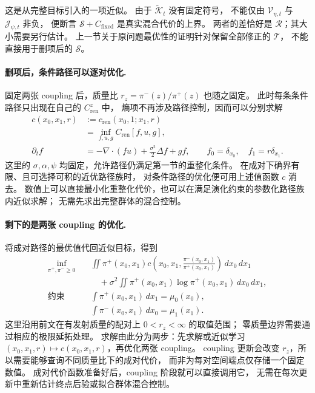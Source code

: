 \documentclass[UTF8,a4paper,11pt,fontset=fandol]{ctexart}
\begin{document}
这是从完整目标引入的一项近似。
由于 $\widetilde{\mathcal K}_t$ 没有固定符号，
不能仅由 $\mathcal V_{\eta,t}$ 与 $\mathcal J_{\psi,t}$ 非负，
便断言 $\mathcal S+C_{\mathrm{fixed}}$ 是真实混合代价的上界。
两者的差恰好是 $\mathcal R$；其大小需要另行估计。
上一节关于原问题最优性的证明针对保留全部修正的 $\mathcal T$，
不能直接用于删项后的 $\mathcal S$。

\paragraph{删项后，条件路径可以逐对优化.}
固定两张 coupling 后，质量比 $r_z=\pi^-(z)/\pi^+(z)$ 也随之固定。
此时每条条件路径只出现在自己的 $C_{\mathrm{ren}}^z$ 中，
熵项不再涉及路径控制，因而可以分别求解
\begin{equation}
\begin{aligned}
c(x_0,x_1,r)
&:=c_{\mathrm{ren}}(x_0,1;x_1,r)\\
&=\inf_{f,u,g}C_{\mathrm{ren}}[f,u,g],\\
\partial_tf
&=-\nabla\cdot(fu)+\frac{\sigma^2}{2}\Delta f+gf,
\qquad f_0=\delta_{x_0},\quad f_1=r\delta_{x_1}.
\end{aligned}
\label{eq:independent-pair-cost}
\end{equation}
这里的 $\sigma,\alpha,\psi$ 均固定，允许路径仍满足第一节的重整化条件。
在成对下确界有限、且可选择可积的近优路径族时，
对条件路径的优化便可用上述值函数 $c$ 消去。
数值上可以直接最小化重整化代价，也可以在满足演化约束的参数化路径族内近似求解；
无需先求出完整群体的混合控制。

\paragraph{剩下的是两张 coupling 的优化.}
将成对路径的最优值代回近似目标，得到
\begin{equation}
\boxed{
\begin{aligned}
\inf_{\pi^+,\pi^-\ge0}\quad
&\iint\pi^+(x_0,x_1)
c\!\left(x_0,x_1,\frac{\pi^-(x_0,x_1)}{\pi^+(x_0,x_1)}\right)\,dx_0\,dx_1\\
&\quad+\sigma^2\iint\pi^+(x_0,x_1)\log\pi^+(x_0,x_1)\,dx_0\,dx_1,\\
\text{约束}\quad
&\int\pi^+(x_0,x_1)\,dx_1=\mu_0(x_0),\\
&\int\pi^-(x_0,x_1)\,dx_0=\mu_1(x_1).
\end{aligned}
}
\label{eq:reduced-semicoupling-problem}
\end{equation}
这里沿用前文在有发射质量的配对上 $0<r_z<\infty$ 的取值范围；
零质量边界需要通过相应的极限延拓处理。
求解由此分为两步：先求解或近似学习
$(x_0,x_1,r)\mapsto c(x_0,x_1,r)$，再优化两张 coupling。
coupling 更新会改变 $r_z$，所以需要能够查询不同质量比下的成对代价，
而非为每对空间端点仅存储一个固定数值。
成对代价函数准备好后，coupling 阶段就可以直接调用它，
无需在每次更新中重新估计终点后验或拟合群体混合控制。
\end{document}
